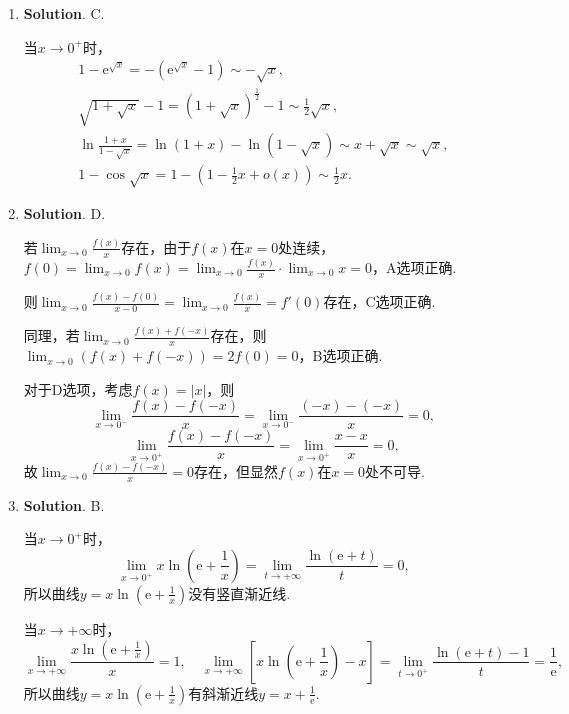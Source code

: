 \documentclass[../main.tex]{subfiles}
\begin{document}
\begin{enumerate}
    \item \textbf{Solution}. C.

          当$x\to0^{+}$时，
          \[
              \begin{gathered}
                  1-\mathrm{e}^{\sqrt{x}}=-\left(\mathrm{e}^{\sqrt{x}}-1\right)\sim -\sqrt{x},\\
                  \sqrt{1+\sqrt{x}}-1=\left(1+\sqrt{x}\right)^{\frac{1}{2}}-1\sim\frac{1}{2}\sqrt{x},\\
                  \ln\frac{1+x}{1-\sqrt{x}}=\ln\left(1+x\right)-\ln\left(1-\sqrt{x}\right)\sim
                  x+\sqrt{x}\sim\sqrt{x},\\
                  1-\cos{\sqrt{x}}=1-\left(1-\frac{1}{2}x+o(x)\right)\sim\frac{1}{2}x.
              \end{gathered}
          \]

    \item \textbf{Solution}. D.

          若$\lim_{x\to0}\frac{f(x)}{x}$存在，由于$f(x)$在$x=0$处连续，$f(0)=\lim_{x\to0}
              f(x)=\lim_{x\to0}\frac{f(x)}{x}\cdot \lim_{x\to0}x=0$，A选项正确.

          则$\lim_{x\to0}\frac{f(x)-f(0)}{x-0}=\lim_{x\to0}\frac{f(x)}{x}=f'(0)$存在，C选项正确.

          同理，若$\lim_{x\to0}\frac{f(x)+f(-x)}{x}$存在，则$\lim_{x\to0}\left(f(x)+f
              (-x)\right)=2f(0)=0$，B选项正确.

          对于D选项，考虑$f(x)=|x|$，则
          \[
              \lim_{x\to0^-}\frac{f(x)-f(-x)}{x}=\lim_{x\to0^-}\frac{(-x)-(-x)}{x}= 0,
          \]
          \[
              \lim_{x\to0^+}\frac{f(x)-f(-x)}{x}=\lim_{x\to0^+}\frac{x-x}{x}=0,
          \]
          故$\lim_{x\to0}\frac{f(x)-f(-x)}{x}=0$存在，但显然$f(x)$在$x=0$处不可导.

    \item \textbf{Solution}. B.

          当$x\to0^{+}$时，
          \[
              \lim_{x\to0^+}x\ln\left(\mathrm{e}+\frac{1}{x}\right)=\lim
              _{t\to+\infty}\frac{\ln(\mathrm{e}+t)}{t}=0,
          \]
          所以曲线$y=x\ln\left(\mathrm{e}+\frac{1}{x}\right)$没有竖直渐近线.

          当$x\to+\infty$时，
          \[
              \lim_{x\to+\infty}\frac{x\ln\left(\mathrm{e}+\frac{1}{x}\right)}{x}
              =1,\quad\lim_{x\to+\infty}\left[x\ln\left(\mathrm{e}+\frac{1}{x}\right)-x\right
              ]=\lim_{t\to0^+}\frac{\ln(\mathrm{e}+t)-1}{t}=\frac{1}{\mathrm{e}},
          \]
          所以曲线$y=x\ln\left(\mathrm{e}+\frac{1}{x}\right)$有斜渐近线$y=x+\frac{1}{\mathrm{e}}$.


\end{enumerate}
\end{document}
